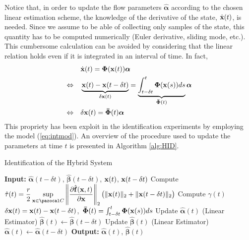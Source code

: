 Notice that, in order to update the flow parameters $\hat{\bm{\alpha}}$ according to the 
% 
{chosen linear estimation scheme}, the knowledge of the derivative of the state, $\dot{\mathbf{x}}(t)$, is needed. Since we assume to be able of collecting only samples of the state, this quantity has to be computed numerically (Euler derivative, sliding mode, etc.). 
This cumbersome calculation can be avoided by considering that the  linear relation holds even if it is integrated in an interval of time. In fact,  %
%
\begin{align}
	&\dot{\mathbf{x}}(t)=\bm{\Phi}(\mathbf{x}(t))\bm{\alpha}\\
	\Leftrightarrow\quad&\underbrace{\mathbf{x}(t)-\mathbf{x}(t-\delta t)}_{\delta\mathbf{x}(t)} = 
	\underbrace{\int_{t-\delta t}^{t}\bm{\Phi}(\mathbf{x}(s))ds}_{\bm{\bar{\Phi}}(t)}\bm{\alpha}\\\label{eq:intmod}
	\Leftrightarrow\quad&\delta\mathbf{x}(t)={\bm{\bar{\Phi}}}(t)\bm{\alpha}
\end{align}
% 
This propriety has been exploit in the identification experiments by employing the model (\ref{eq:intmod}).
An overview of the procedure used to update the parameters at time $t$ is presented in Algorithm \ref{alg:HID}.
%
\begin{algorithm}[!b]
	\caption{Identification of the Hybrid System}\label{alg:HID}
	\begin{algorithmic}[1]
		\State \textbf{Input:} $\hat{\bm{\alpha}}(t-\delta t)$, $\hat{\bm{\beta}}(t-\delta t)$, $\mathbf{x}(t)$, $\mathbf{x}(t-\delta t)$
		\State Compute $\hat{\tau}(t)=\dfrac{r}{2}\sup\limits_{\x\in\C}\left\|\dfrac{\partial \hat{\mathbf{f}}(\x,t)}{\partial\x}\right\|_2\big(\|\x(t)\|_2+\|\x(t-\delta t)\|_2\big)$
		\State Compute $\gamma(t)$
		\State $\delta\mathbf{x}(t) = \mathbf{x}(t)-\mathbf{x}(t-\delta t)$,~$\bm{\bar{\Phi}}(t)=\int_{t-\delta t}^{t}\bm{\Phi}(\mathbf{x}(s))ds$
		\State Update $\hat{\bm{\alpha}}(t)$ (Linear Estimator)%
		\State $\hat{\bm{\beta}}(t)\gets\hat{\bm{\beta}}(t-\delta t)$
		\Else
		\State Update $\hat{\bm{\beta}}(t)$ (Linear Estimator)%
		\State $\hat{\bm{\alpha}}(t)\gets\hat{\bm{\alpha}}(t-\delta t)$
		\EndIf
		\State \textbf{Output:} $\hat{\bm{\alpha}}(t)$, $\hat{\bm{\beta}}(t)$
	\end{algorithmic}
\end{algorithm}
%
